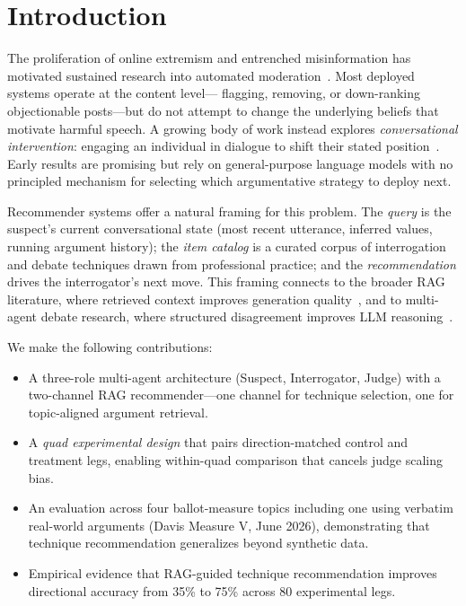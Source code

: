 \documentclass[sigconf]{acmart}
\begin{document}
\section{Introduction}

The proliferation of online extremism and entrenched misinformation has
motivated sustained research into automated moderation~\cite{kumar2023language,
gorwa2020algorithmic}. Most deployed systems operate at the content level---
flagging, removing, or down-ranking objectionable posts---but do not attempt to
change the underlying beliefs that motivate harmful speech. A growing body of
work instead explores \emph{conversational intervention}: engaging an individual
in dialogue to shift their stated position~\cite{costello2024durably}. Early
results are promising but rely on general-purpose language models with no
principled mechanism for selecting which argumentative strategy to deploy next.

Recommender systems offer a natural framing for this problem. The
\emph{query} is the suspect's current conversational state (most recent
utterance, inferred values, running argument history); the \emph{item catalog}
is a curated corpus of interrogation and debate techniques drawn from
professional practice; and the \emph{recommendation} drives the interrogator's
next move. This framing connects to the broader RAG literature, where retrieved
context improves generation quality~\cite{izacard2022few}, and to multi-agent
debate research, where structured disagreement improves LLM
reasoning~\cite{estornell2024scaling}.

We make the following contributions:
\begin{itemize}
  \item A three-role multi-agent architecture (Suspect, Interrogator, Judge)
    with a two-channel RAG recommender---one channel for technique selection,
    one for topic-aligned argument retrieval.
  \item A \emph{quad experimental design} that pairs direction-matched control
    and treatment legs, enabling within-quad comparison that cancels judge
    scaling bias.
  \item An evaluation across four ballot-measure topics including one using
    verbatim real-world arguments (Davis Measure V, June 2026), demonstrating
    that technique recommendation generalizes beyond synthetic data.
  \item Empirical evidence that RAG-guided technique recommendation improves
    directional accuracy from 35\% to 75\% across 80 experimental legs.
\end{itemize}
\end{document}
